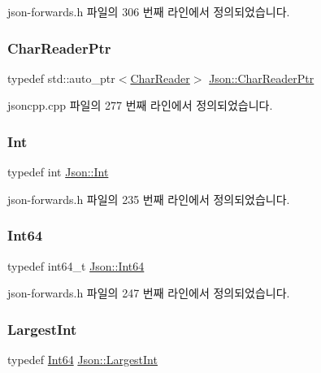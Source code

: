 json-\/forwards.\+h 파일의 306 번째 라인에서 정의되었습니다.

\mbox{\label{namespace_json_a4724efb8d41614b47036cb8b54233837}} 
\subsubsection{\texorpdfstring{Char\+Reader\+Ptr}{CharReaderPtr}}
{\footnotesize\ttfamily typedef std\+::auto\+\_\+ptr$<$\hyperlink{class_json_1_1_char_reader}{Char\+Reader}$>$ \hyperlink{namespace_json_a4724efb8d41614b47036cb8b54233837}{Json\+::\+Char\+Reader\+Ptr}}



jsoncpp.\+cpp 파일의 277 번째 라인에서 정의되었습니다.

\mbox{\label{namespace_json_a08122e8005b706d982e48cca1e2119c7}} 
\subsubsection{\texorpdfstring{Int}{Int}}
{\footnotesize\ttfamily typedef int \hyperlink{namespace_json_a08122e8005b706d982e48cca1e2119c7}{Json\+::\+Int}}



json-\/forwards.\+h 파일의 235 번째 라인에서 정의되었습니다.

\mbox{\label{namespace_json_ac62566f36fd33115957b91305c9ed1dc}} 
\subsubsection{\texorpdfstring{Int64}{Int64}}
{\footnotesize\ttfamily typedef int64\+\_\+t \hyperlink{namespace_json_ac62566f36fd33115957b91305c9ed1dc}{Json\+::\+Int64}}



json-\/forwards.\+h 파일의 247 번째 라인에서 정의되었습니다.

\mbox{\label{namespace_json_a218d880af853ce786cd985e82571d297}} 
\subsubsection{\texorpdfstring{Largest\+Int}{LargestInt}}
{\footnotesize\ttfamily typedef \hyperlink{namespace_json_ac62566f36fd33115957b91305c9ed1dc}{Int64} \hyperlink{namespace_json_a218d880af853ce786cd985e82571d297}{Json\+::\+Largest\+Int}}



